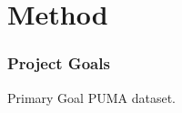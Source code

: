 \documentclass[../main.tex]{subfiles}
\begin{document}
\section{Method}
\begin{frame}[t]
    \frametitle{Project Goals}

    \begin{block}{Primary Goal}
        PUMA dataset.
    \end{block}
\end{frame}
\end{document}
